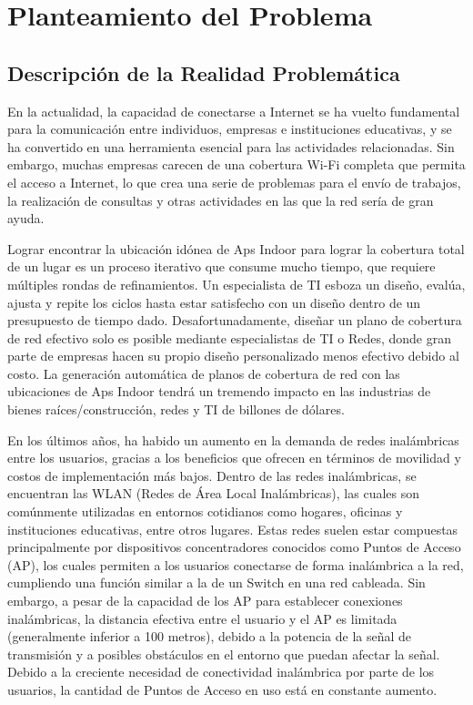 \chapter{Planteamiento del Problema}
\section{Descripción de la Realidad Problemática}

En la actualidad, la capacidad de conectarse a Internet se ha vuelto fundamental para la comunicación entre individuos, empresas e instituciones educativas, y se ha convertido en una herramienta esencial para las actividades relacionadas. Sin embargo, muchas empresas carecen de una cobertura Wi-Fi completa que permita el acceso a Internet, lo que crea una serie de problemas para el envío de trabajos, la realización de consultas y otras actividades en las que la red sería de gran ayuda.

Lograr encontrar la ubicación idónea de Aps Indoor para lograr la cobertura total de un lugar es un proceso iterativo que consume mucho tiempo, que requiere múltiples rondas de refinamientos. Un especialista de TI esboza un diseño, evalúa, ajusta y repite los ciclos hasta estar satisfecho con un diseño dentro de un presupuesto de tiempo dado. Desafortunadamente, diseñar un plano de cobertura de red efectivo solo es posible mediante especialistas de TI o Redes, donde gran parte de empresas hacen su propio diseño personalizado menos efectivo debido al costo. La generación automática de planos de cobertura de red con las ubicaciones de Aps Indoor tendrá un tremendo impacto en las industrias de bienes raíces/construcción, redes y TI de billones de dólares.

En los últimos años, ha habido un aumento en la demanda de redes inalámbricas entre los usuarios, gracias a los beneficios que ofrecen en términos de movilidad y costos de implementación más bajos. Dentro de las redes inalámbricas, se encuentran las WLAN (Redes de Área Local Inalámbricas), las cuales son comúnmente utilizadas en entornos cotidianos como hogares, oficinas y instituciones educativas, entre otros lugares. Estas redes suelen estar compuestas principalmente por dispositivos concentradores conocidos como Puntos de Acceso (AP), los cuales permiten a los usuarios conectarse de forma inalámbrica a la red, cumpliendo una función similar a la de un Switch en una red cableada. Sin embargo, a pesar de la capacidad de los AP para establecer conexiones inalámbricas, la distancia efectiva entre el usuario y el AP es limitada (generalmente inferior a 100 metros), debido a la potencia de la señal de transmisión y a posibles obstáculos en el entorno que puedan afectar la señal. Debido a la creciente necesidad de conectividad inalámbrica por parte de los usuarios, la cantidad de Puntos de Acceso en uso está en constante aumento.

